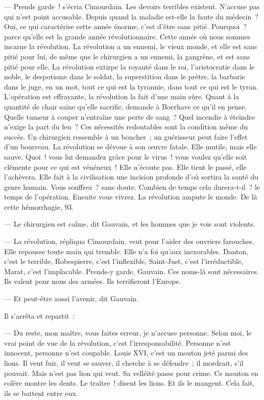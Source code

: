 \documentclass[french,twoside]{book} %
\begin{document}
— Prends garde ! s’écria Cimourdain. Les devoirs terribles existent. N’accuse pas qui n’est point accusable. Depuis quand la maladie est-elle la faute du  médecin ? Oui, ce qui caractérise cette année énorme, c’est d’être sans pitié. Pourquoi ? parce qu’elle est la grande année révolutionnaire. Cette année où nous sommes incarne la révolution. La révolution a un ennemi, le vieux monde, et elle est sans pitié pour lui, de même que le chirurgien a un ennemi, la gangrène, et est sans pitié pour elle. La révolution extirpe la royauté dans le roi, l’aristocratie dans le noble, le despotisme dans le soldat, la superstition dans le prêtre, la barbarie dans le juge, en un mot, tout ce qui est la tyrannie, dans tout ce qui est le tyran. L’opération est effrayante, la révolution la fait d’une main sûre. Quant à la quantité de chair saine qu’elle sacrifie, demande à Boerhave ce qu’il en pense. Quelle tumeur à couper n’entraîne une perte de sang ? Quel incendie à éteindre n’exige la part du feu ? Ces nécessités redoutables sont la condition même du succès. Un chirurgien ressemble à un boucher ; un guérisseur peut faire l’effet d’un bourreau. La révolution se dévoue à son œuvre fatale. Elle mutile, mais elle sauve. Quoi ! vous lui demandez grâce pour le virus ! vous voulez qu’elle soit clémente pour ce qui est vénéneux ! Elle n’écoute pas. Elle tient le passé, elle l’achèvera. Elle fait à la civilisation une incision profonde d’où sortira la santé du genre humain. Vous souffrez ? sans doute. Combien de temps cela durera-t-il ? le temps de l’opération. Ensuite vous vivrez. La révolution ampute le monde. De là cette hémorrhagie, 93.\par
— Le chirurgien est calme, dit Gauvain, et les hommes que je vois sont violents.\par
 — La révolution, répliqua Cimourdain, veut pour l’aider des ouvriers farouches. Elle repousse toute main qui tremble. Elle n’a foi qu’aux inexorables. Danton, c’est le terrible, Robespierre, c’est l’inflexible, Saint-Just, c’est l’irréductible, Marat, c’est l’implacable. Prends-y garde, Gauvain. Ces noms-là sont nécessaires. Ils valent pour nous des armées. Ils terrifieront l’Europe.\par
— Et peut-être aussi l’avenir, dit Gauvain.\par
Il s’arrêta et repartit :\par
— Du reste, mon maître, vous faites erreur, je n’accuse personne. Selon moi, le vrai point de vue de la révolution, c’est l’irresponsabilité. Personne n’est innocent, personne n’est coupable. Louis XVI, c’est un mouton jeté parmi des lions. Il veut fuir, il veut se sauver, il cherche à se défendre ; il mordrait, s’il pouvait. Mais n’est pas lion qui veut. Sa velléité passe pour crime. Ce mouton en colère montre les dents. Le traître ! disent les lions. Et ils le mangent. Cela fait, ils se battent entre eux.\par
\end{document}
